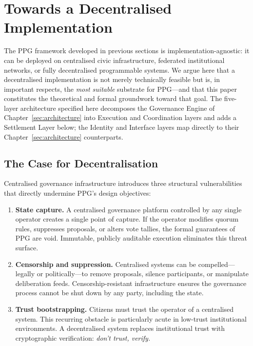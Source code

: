 \documentclass[12pt,a4paper,oneside]{report}
\begin{document}
\chapter{Towards a Decentralised Implementation}
\label{sec:decentralised}

The PPG framework developed in previous sections is implementation-agnostic: it can be deployed on centralised civic infrastructure, federated institutional networks, or fully decentralised programmable systems. We argue here that a decentralised implementation is not merely technically feasible but is, in important respects, the \emph{most suitable} substrate for PPG---and that this paper constitutes the theoretical and formal groundwork toward that goal. The five-layer architecture specified here decomposes the Governance Engine of Chapter~\ref{sec:architecture} into Execution and Coordination layers and adds a Settlement Layer below; the Identity and Interface layers map directly to their Chapter~\ref{sec:architecture} counterparts.

\section{The Case for Decentralisation}

Centralised governance infrastructure introduces three structural vulnerabilities that directly undermine PPG's design objectives:

\begin{enumerate}
  \item \textbf{State capture.} A centralised governance platform controlled by any single operator creates a single point of capture. If the operator modifies quorum rules, suppresses proposals, or alters vote tallies, the formal guarantees of PPG are void. Immutable, publicly auditable execution eliminates this threat surface.
  \item \textbf{Censorship and suppression.} Centralised systems can be compelled---legally or politically---to remove proposals, silence participants, or manipulate deliberation feeds. Censorship-resistant infrastructure ensures the governance process cannot be shut down by any party, including the state.
  \item \textbf{Trust bootstrapping.} Citizens must trust the operator of a centralised system. This recurring obstacle is particularly acute in low-trust institutional environments. A decentralised system replaces institutional trust with cryptographic verification: \emph{don't trust, verify.}
\end{enumerate}
\end{document}
